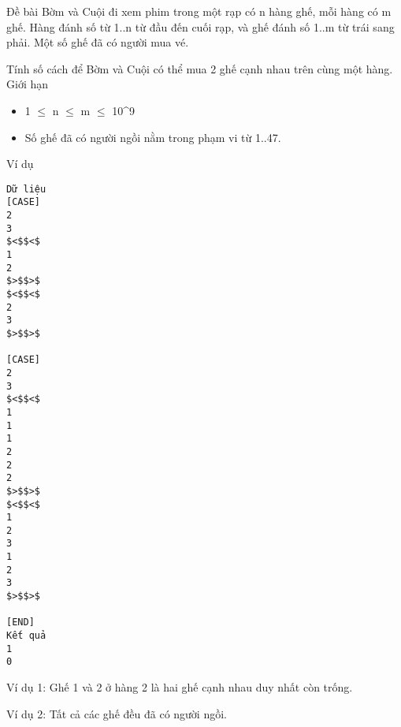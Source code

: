 Đề bài
Bờm và Cuội đi xem phim trong một rạp có n hàng ghế, mỗi hàng có m ghế. Hàng đánh số từ 1..n từ đầu đến cuối rạp, và ghế đánh số 1..m từ trái sang phải. Một số ghế đã có người mua vé.  

   Tính số cách để Bờm và Cuội có thể mua 2 ghế cạnh nhau trên cùng một hàng.
Giới hạn
\begin{itemize}
	\item     1  $\le$  n  $\le$  m  $\le$  10^9   
	\item     Số ghế đã có người ngồi nằm trong phạm vi từ 1..47.   
\end{itemize}
Ví dụ
\begin{verbatim}
Dữ liệu
[CASE]
2
3
$<$$<$
1
2
$>$$>$
$<$$<$
2
3
$>$$>$

[CASE]
2
3
$<$$<$
1
1
1
2
2
2
$>$$>$
$<$$<$
1
2
3
1
2
3
$>$$>$

[END]
Kết quả
1
0
\end{verbatim}

   Ví dụ 1: Ghế 1 và 2 ở hàng 2 là hai ghế cạnh nhau duy nhất còn trống.  

   Ví dụ 2: Tất cả các ghế đều đã có người ngồi.